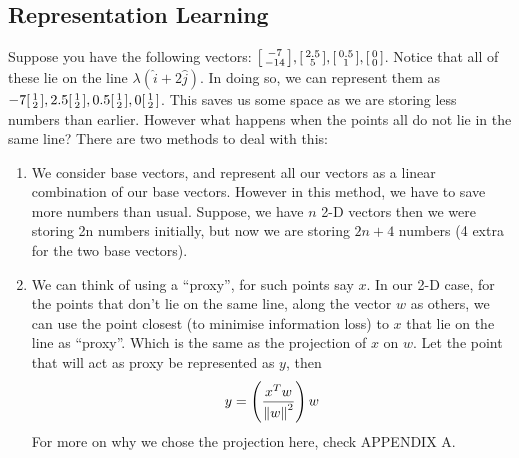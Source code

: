 \documentclass[12pt,a4paper]{article}
\begin{document}
\subsection{Representation Learning}

Suppose you have the following vectors: $\begin{bsmallmatrix}
    -7 \\ -14
\end{bsmallmatrix}, \begin{bsmallmatrix}
    2.5 \\ 5
\end{bsmallmatrix}, \begin{bsmallmatrix}
    0.5 \\ 1 
\end{bsmallmatrix}, \begin{bsmallmatrix}
    0 \\ 0
\end{bsmallmatrix}$. Notice that all of these lie on the line $\lambda(\hat{i}+2\hat{j})$. In doing so, we can represent them as $-7\begin{bsmallmatrix}
    1 \\ 2
\end{bsmallmatrix}, 2.5 \begin{bsmallmatrix}
    1 \\ 2
\end{bsmallmatrix}, 0.5 \begin{bsmallmatrix}
    1 \\ 2
\end{bsmallmatrix}, 0 \begin{bsmallmatrix}
    1 \\ 2
\end{bsmallmatrix}$. This saves us some space as we are storing less numbers than earlier. However what happens when the points all do not lie in the same line?
There are two methods to deal with this:
\begin{enumerate}
    \item We consider base vectors, and represent all our vectors as a linear combination of our base vectors. However in this method, we have to save more numbers than usual. Suppose, we have $n$ 2-D vectors then we were storing 2n numbers initially, but now we are storing $2n+4$ numbers (4 extra for the two base vectors).
    \item We can think of using a ``proxy'', for such points say $x$. In our 2-D case, for the points that don't lie on the same line, along the vector $w$ as others, we can use the point closest (to minimise information loss) to $x$ that lie on the line as ``proxy''. Which is the same as the projection of $x$ on $w$. Let the point that will act as proxy be represented as $y$, then $$y= \left(\dfrac{x^Tw}{\norm{w}^2} \right) w$$
    For more on why we chose the projection here, check APPENDIX A.
\end{enumerate}
\end{document}

